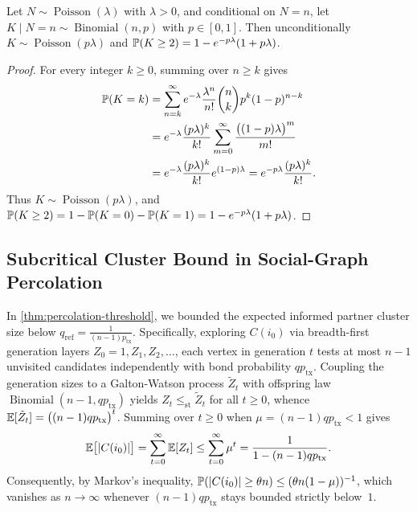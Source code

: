 \begin{lemma}
\label{lem:app-poisson}
Let $N \sim \operatorname{Poisson}(\lambda)$ with $\lambda > 0$, and conditional
on $N = n$, let $K \mid N = n \sim \operatorname{Binomial}(n, p)$ with
$p \in [0, 1]$. Then unconditionally $K \sim \operatorname{Poisson}(p\lambda)$
and $\mathbb{P}(K \ge 2) = 1 - e^{-p\lambda}(1 + p\lambda)$.
\end{lemma}
\begin{proof}
For every integer $k \ge 0$, summing over $n \ge k$ gives
\begin{align*}
  \mathbb{P}(K = k)
  &= \sum_{n=k}^{\infty} e^{-\lambda}\frac{\lambda^n}{n!}\binom{n}{k} p^k (1 - p)^{n-k} \\
  &= e^{-\lambda}\frac{(p\lambda)^k}{k!} \sum_{m=0}^{\infty} \frac{\bigl((1 - p)\lambda\bigr)^m}{m!} \\
  &= e^{-\lambda}\frac{(p\lambda)^k}{k!} e^{(1-p)\lambda}
  = e^{-p\lambda}\frac{(p\lambda)^k}{k!}.
\end{align*}
Thus $K \sim \operatorname{Poisson}(p\lambda)$, and
$\mathbb{P}(K \ge 2) = 1 - \mathbb{P}(K = 0) - \mathbb{P}(K = 1) = 1 - e^{-p\lambda}(1 + p\lambda)$.
\end{proof}

\subsection{Subcritical Cluster Bound in Social-Graph Percolation}
\label{app:proof-percolation}

In \cref{thm:percolation-threshold}, we bounded the expected informed partner
cluster size below $q_{\mathrm{ref}} = \frac{1}{(n - 1)p_{\mathrm{tx}}}$.
Specifically, exploring $C(i_0)$ via breadth-first generation layers
$Z_0 = 1, Z_1, Z_2, \dots$, each vertex in generation $t$ tests at most
$n - 1$ unvisited candidates independently with bond probability $q p_{\mathrm{tx}}$.
Coupling the generation sizes to a Galton-Watson process $\tilde{Z}_t$ with
offspring law $\operatorname{Binomial}(n - 1, q p_{\mathrm{tx}})$ yields
$Z_t \le_{\mathrm{st}} \tilde{Z}_t$ for all $t \ge 0$, whence
$\mathbb{E}[\tilde{Z}_t] = \bigl((n - 1) q p_{\mathrm{tx}}\bigr)^t$. Summing over
$t \ge 0$ when $\mu = (n - 1) q p_{\mathrm{tx}} < 1$ gives
\begin{equation*}
  \mathbb{E}\bigl[\lvert C(i_0) \rvert\bigr]
  = \sum_{t=0}^{\infty} \mathbb{E}[Z_t]
  \le \sum_{t=0}^{\infty} \mu^t
  = \frac{1}{1 - (n - 1) q p_{\mathrm{tx}}}.
\end{equation*}
Consequently, by Markov's inequality, $\mathbb{P}(\lvert C(i_0) \rvert \ge \theta n) \le (\theta n (1 - \mu))^{-1}$,
which vanishes as $n \to \infty$ whenever $(n - 1) q p_{\mathrm{tx}}$ stays bounded
strictly below~$1$.
